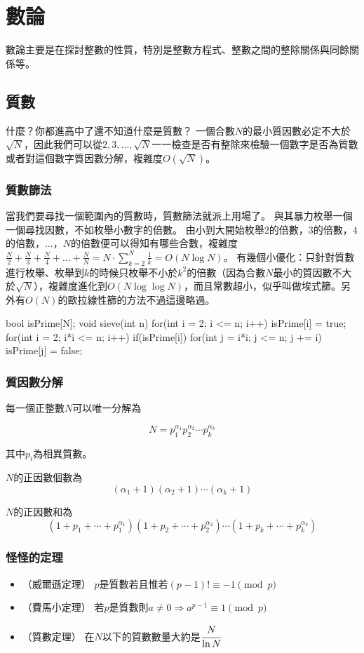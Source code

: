 \documentclass[main.tex]{subfiles}
\begin{document}
\chapter{數論 \uppercase\expandafter{}}
數論主要是在探討整數的性質，特別是整數方程式、整數之間的整除關係與同餘關係等。

\section{質數}
什麼？你都進高中了還不知道什麼是質數？
一個合數$N$的最小質因數必定不大於$\sqrt{N}$，因此我們可以從$2,3,\dots,\sqrt{N}$一一檢查是否有整除來檢驗一個數字是否為質數或者對這個數字質因數分解，複雜度$O(\sqrt{N})$。

\subsection{質數篩法}
當我們要尋找一個範圍內的質數時，質數篩法就派上用場了。
與其暴力枚舉一個一個尋找因數，不如枚舉小數字的倍數。
由小到大開始枚舉$2$的倍數，$3$的倍數，$4$的倍數，$\dots$，$N$的倍數便可以得知有哪些合數，複雜度$\frac{N}{2}+\frac{N}{3}+\frac{N}{4}+\dots+\frac{N}{N} = N \cdot \sum_{k=2}^N \frac{1}{k} = O(N\log N)$。
有幾個小優化：只針對質數進行枚舉、枚舉到$k$的時候只枚舉不小於$k^2$的倍數（因為合數$N$最小的質因數不大於$\sqrt{N}$），複雜度進化到$O(N \log \log N)$，而且常數超小，似乎叫做埃式篩。另外有$O(N)$的歐拉線性篩的方法不過這邊略過。
\begin{C++}
bool isPrime[N];
void sieve(int n) {
	for(int i = 2; i <= n; i++) isPrime[i] = true;
	for(int i = 2; i*i <= n; i++) if(isPrime[i]) {
		for(int j = i*i; j <= n; j += i) {
			isPrime[j] = false;
		}
	}
}
\end{C++}

\subsection{質因數分解}
每一個正整數$N$可以唯一分解為

$$
N = p_1^{\alpha_1}p_2^{\alpha_2}\cdots p_k^{\alpha_k}
$$

其中$p_i$為相異質數。

$N$的正因數個數為
$$(\alpha_1+1)(\alpha_2+1)\cdots(\alpha_k+1)$$

$N$的正因數和為
$$(1+p_1+\cdots+p_1^{\alpha_1})(1+p_2+\cdots+p_2^{\alpha_2}) \cdots (1+p_k+\cdots+p_k^{\alpha_k})$$

\subsection{怪怪的定理}
\begin{itemize}
\item （威爾遜定理） $p$是質數若且惟若$(p-1)! \equiv -1 \pmod p$
\item （費馬小定理） 若$p$是質數則$a \neq 0 \Rightarrow a^{p-1} \equiv 1 \pmod p$
\item （質數定理） 在$N$以下的質數數量大約是$\cfrac{N}{\ln N}$
\end{itemize}
\end{document}
